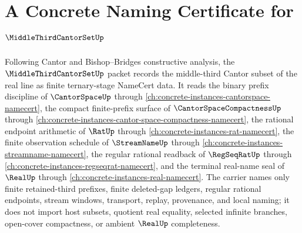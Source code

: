 \chapter{A Concrete Naming Certificate for $\MiddleThirdCantorSetUp$}
\label{ch:concrete-instances-middle-third-cantor-set-namecert}

Following Cantor and Bishop--Bridges constructive analysis, the $\MiddleThirdCantorSetUp$ packet records the middle-third Cantor subset of the real line as finite ternary-stage NameCert data. It reads the binary prefix discipline of $\CantorSpaceUp$ through \autoref{ch:concrete-instances-cantorspace-namecert}, the compact finite-prefix surface of $\CantorSpaceCompactnessUp$ through \autoref{ch:concrete-instances-cantor-space-compactness-namecert}, the rational endpoint arithmetic of $\RatUp$ through \autoref{ch:concrete-instances-rat-namecert}, the finite observation schedule of $\StreamNameUp$ through \autoref{ch:concrete-instances-streamname-namecert}, the regular rational readback of $\RegSeqRatUp$ through \autoref{ch:concrete-instances-regseqrat-namecert}, and the terminal real-name seal of $\RealUp$ through \autoref{ch:concrete-instances-real-namecert}. The carrier names only finite retained-third prefixes, finite deleted-gap ledgers, regular rational endpoints, stream windows, transport, replay, provenance, and local naming; it does not import host subsets, quotient real equality, selected infinite branches, open-cover compactness, or ambient $\RealUp$ completeness.

